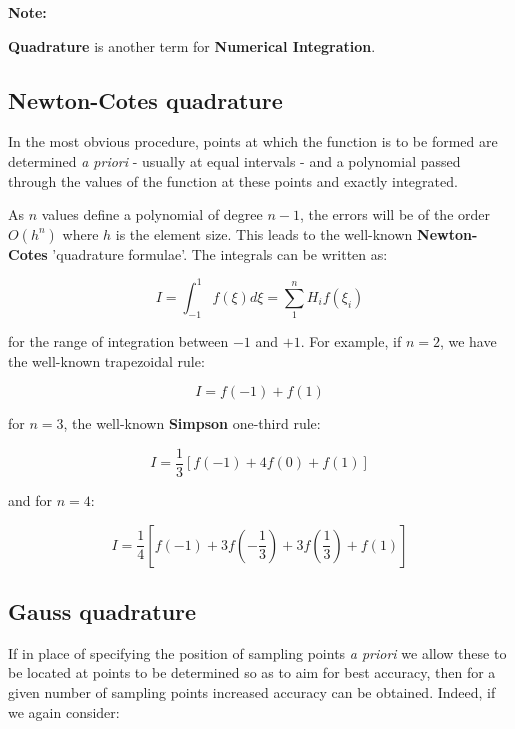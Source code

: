 \begin{bbox}
    \textbf{Note:}

    \textbf{Quadrature} is another term for \textbf{Numerical Integration}.
\end{bbox}


\subsection{Newton-Cotes quadrature}
In the most obvious procedure, points at which the function is to be formed are
determined \textit{a priori} - usually at equal intervals - and a polynomial
passed through the values of the function at these points and exactly integrated.

As $ n $ values define a polynomial of degree $ n - 1 $, the errors will be
of the order $ O(h^n) $ where $ h $ is the element size. This leads to the
well-known \textbf{Newton-Cotes} 'quadrature formulae'. The integrals can be
written as:

\begin{equation}
    I = \int_{-1}^{1} f(\xi) d\xi = \sum_1^n H_i f(\xi_i)
\end{equation}

for the range of integration between $ -1 $ and $ +1 $. For example, if $ n = 2 $,
we have the well-known trapezoidal rule:

\begin{equation}
    I = f(-1) + f(1)
\end{equation}

for $ n = 3 $, the well-known \textbf{Simpson} one-third rule:

\begin{equation}
    I = \frac{1}{3} \left[ f(-1) + 4f(0) + f(1) \right]
\end{equation}

and for $ n = 4 $:

\begin{equation}
    I = \frac{1}{4} \left[f(-1) + 3f(-\frac{1}{3}) + 3f(\frac{1}{3}) + f(1) \right]
\end{equation}


\subsection{Gauss quadrature}

If in place of specifying the position of sampling points \textit{a priori} we
allow these to be located at points to be determined so as to aim for best
accuracy, then for a given number of sampling points increased accuracy can be
obtained. Indeed, if we again consider:

